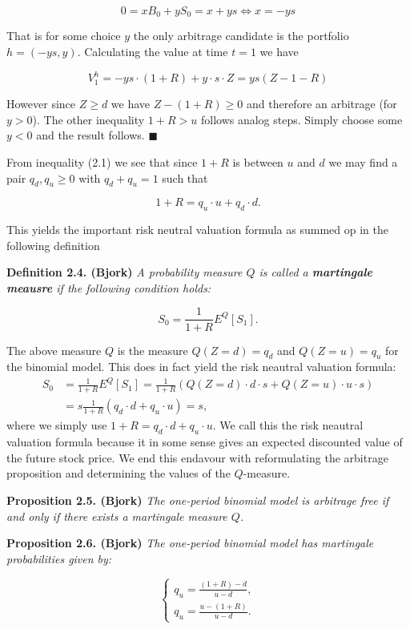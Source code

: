 \documentclass[
]{book}
\begin{document}
\[0=xB_0+yS_0=x+ys\iff x=-ys\]

That is for some choice \(y\) the only arbitrage candidate is the portfolio \(h=(-ys,y)\). Calculating the value at time \(t=1\) we have

\[V_1^h=-ys\cdot(1+R)+y\cdot s\cdot Z=ys(Z-1-R)\]

However since \(Z\ge d\) we have \(Z-(1+R)\ge 0\) and therefore an arbitrage (for \(y>0\)). The other inequality \(1+R>u\) follows analog steps. Simply choose some \(y<0\) and the result follows. \(\blacksquare\)

\noindent\makebox[\linewidth]{\rule{\textwidth}{0.4pt}}
From inequality (2.1) we see that since \(1+R\) is between \(u\) and \(d\) we may find a pair \(q_d,q_u\ge 0\) with \(q_d+q_u=1\) such that

\[1+R=q_u\cdot u+q_d\cdot d.\]

This yields the important risk neutral valuation formula as summed op in the following definition

\textbf{Definition 2.4. (Bjork)} \emph{A probability measure \(Q\) is called a \textbf{martingale meausre} if the following condition holds:}

\[S_0=\frac{1}{1+R}E^Q[S_1].\]

The above measure \(Q\) is the measure \(Q(Z=d)=q_d\) and \(Q(Z=u)=q_u\) for the binomial model. This does in fact yield the risk neautral valuation formula:
\begin{align*}
S_0&=\frac{1}{1+R}E^Q[S_1]=\frac{1}{1+R}(Q(Z=d)\cdot d\cdot s+Q(Z=u)\cdot u\cdot s)\\
&=s\frac{1}{1+R}(q_d\cdot d+q_u\cdot u)=s,
\end{align*}
where we simply use \(1+R=q_d\cdot d+q_u\cdot u\). We call this the risk neautral valuation formula because it in some sense gives an expected discounted value of the future stock price. We end this endavour with reformulating the arbitrage proposition and determining the values of the \(Q\)-measure.

\textbf{Proposition 2.5. (Bjork)} \emph{The one-period binomial model is arbitrage free if and only if there exists a martingale measure \(Q\).}

\textbf{Proposition 2.6. (Bjork)} \emph{The one-period binomial model has martingale probabilities given by:}

\[\left\{\begin{matrix}q_u=\frac{(1+R)-d}{u-d},\\ q_u=\frac{u-(1+R)}{u-d}.\end{matrix}\right.\]
\end{document}

